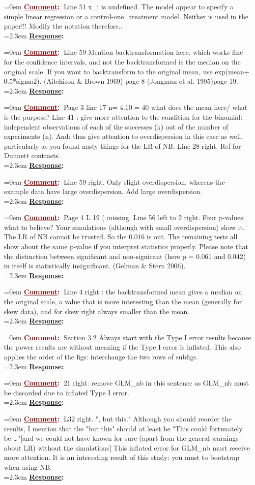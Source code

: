 \documentclass[12pt]{article}
\newcommand{\comment}[0]{\vspace{1em} \noindent \hangindent=0em \textbf{\textcolor{Maroon}{\uline{Comment}:~}}}
\newcommand{\response}[0]{\\\vspace{0.1em} \hangindent=2.3em \textbf{\textcolor{NavyBlue}{\uline{Response}:~}}}
\begin{document}
\comment Line 51 x\_i is undefined. The model appear to specify a simple linear regression or a control-one\_treatment model. Neither is used in the paper!!! Modify the notation therefore..
\response

\comment Line 59 Mention backtransformation here, which works fine for the confidence intervals, and not the backtransformed is the median on the original scale. If you want to backtransform to the original mean, use exp(mean+ 0.5*sigma2). (Aitchison \& Brown 1969) page 8 (Jongman et al. 1995)page 19. 
\response

\comment Page 3 line 17 n= 4.10 = 40 what does the mean here/ what is the purpose?
Line 41 : give more attention to the condition for the binomial: independent observations of each of the successes (k) out of the number of experiments (n).
And: thus give attention to overdispersion in this case as well, particularly as you found nasty things for the LR of  NB.
Line 28 right. Ref for Dunnett contrasts.
\response

\comment Line 59 right. Only slight overdispersion, whereas the example data have large  overdispersion. Add large overdispersion.
\response

\comment Page 4 
L 19 ( missing.
Line 56 left to 2 right. Four p-values: what to believe? Your simulations (although with small overdispersion) show it. The LR of NB cannot be trusted. So the 0.016 is out. The remaining tests all show about the same p-value if you interpret statistics properly. Please note that the distinction between significant and non-signicant (here p = 0.061 and 0.042) in itself is statistically insignificant. (Gelman \& Stern 2006).
\response

\comment Line 4 right : the backtransformed mean gives a median on the original scale, a value that is more interesting than the mean (generally for skew data),  and for skew right always smaller than the mean.
\response

\comment Section 3.2
Always start with the Type I error results because the power results are without meaning if the Type I error is inflated. This also applies the order of the figs: interchange the two rows of subfigs. 
\response

\comment 21 right: remove GLM\_nb in this sentence as GLM\_nb must be discarded due to inflated Type I error.
\response

\comment L32 right. ", but this." Although you should reorder the results, I mention that the "but this" should at least be "This could fortunately be …"[and we could not have known for sure (apart from the general warnings about LR) without the simulations] This inflated error for GLM\_nb must receive more attention. It is an interesting result of this study: you must to bootstrap when using NB.
\response
\end{document}
